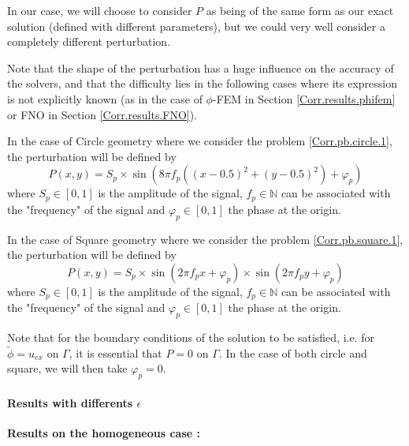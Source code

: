 In our case, we will choose to consider $P$ as being of the same form as our exact solution (defined with different parameters), but we could very well consider a completely different perturbation. 

\begin{Rem}
	Note that the shape of the perturbation has a huge influence on the accuracy of the solvers, and that the difficulty lies in the following cases where its expression is not explicitly known (as in the case of $\phi$-FEM in Section \ref{Corr.results.phifem} or FNO in Section \ref{Corr.results.FNO}).
\end{Rem}

In the case of Circle geometry where we consider the problem \ref{Corr.pb.circle.1}, the perturbation will be defined by
\begin{equation*}
	P(x,y)=S_p\times\sin\left(8\pi f_p\left((x-0.5)^2+(y-0.5)^2\right)+\varphi_p\right)
\end{equation*}
where $S_p\in[0,1]$ is the amplitude of the signal, $f_p\in\mathbb{N}$ can be associated with the "frequency" of the signal and $\varphi_p\in[0,1]$ the phase at the origin.

In the case of Square geometry where we consider the problem \ref{Corr.pb.square.1}, the perturbation will be defined by
\begin{equation*}
	P(x,y)=S_p\times\sin\left(2\pi f_px+\varphi_p\right)\times\sin\left(2\pi f_py+\varphi_p\right)
\end{equation*}
where $S_p\in[0,1]$ is the amplitude of the signal, $f_p\in\mathbb{N}$ can be associated with the "frequency" of the signal and $\varphi_p\in[0,1]$ the phase at the origin.

\begin{Rem}
	Note that for the boundary conditions of the solution to be satisfied, i.e. for $\tilde{\phi}=u_{ex}$ on $\Gamma$, it is essential that $P=0$ on $\Gamma$. In the case of both circle and square, we will then take $\varphi_p=0$.
\end{Rem}

\paragraph{Results with differents $\epsilon$} \label{Corr.results.disturbed.eps} 

\textbf{Results on the homogeneous case :}

